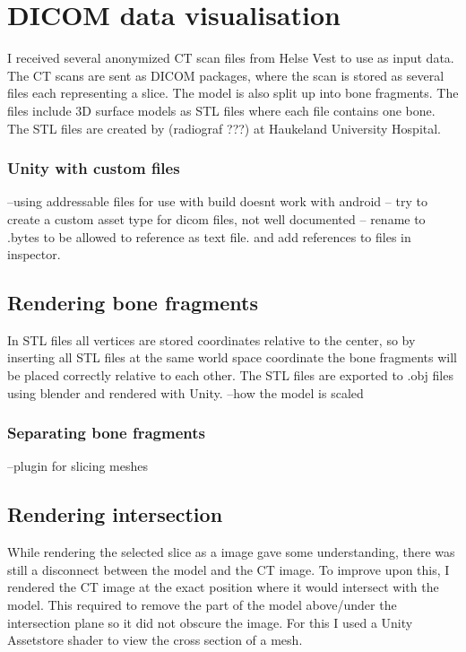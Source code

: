 \documentclass[a4paper]{report}
\begin{document}
\section{DICOM data visualisation}
I received several anonymized CT scan files from Helse Vest to use as input data. The CT scans are sent as DICOM packages\cite{noauthor_dicom_nodate}, where the scan is stored as several files each representing a slice. 
The model is also split up into bone fragments. The files include 3D surface models as STL files where each file contains one bone. The STL files are created by (radiograf ???) at Haukeland University Hospital.


\subsubsection{Unity with custom files}
--using addressable files for use with build doesnt work with android
-- try to create a custom asset type for dicom files, not well documented
-- rename to .bytes to be allowed to reference as text file. 
and add references to files in inspector.

\subsection{Rendering bone fragments}
In STL files all vertices are stored coordinates relative to the center, so by inserting all STL files at the same world space coordinate the bone fragments will be placed correctly relative to each other. The STL files are exported to .obj files using blender and rendered with Unity.
--how the model is scaled

\subsubsection{Separating bone fragments}
--plugin for slicing meshes

\subsection{Rendering intersection}
While rendering the selected slice as a image gave some understanding, there was still a disconnect between the model and the CT image. To improve upon this, I rendered the CT image at the exact position where it would intersect with the model.
This required to remove the part of the model above/under the intersection plane so it did not obscure the image. For this I used a Unity Assetstore shader to view the cross section of a mesh\cite{aldandarawy_unity_2019}. 
\end{document}
